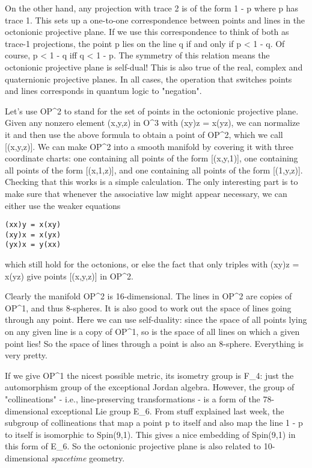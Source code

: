 On the other hand, any projection with trace 2 is of the form 1 - p
where p has trace 1.  This sets up a one-to-one correspondence between
points and lines in the octonionic projective plane.  If we use this
correspondence to think of both as trace-1 projections, the point p
lies on the line q if and only if p < 1 - q.  Of course, p < 1 - q
iff q < 1 - p.   The symmetry of this relation means the octonionic
projective plane is self-dual!  This is also true of the real, complex
and quaternionic projective planes.  In all cases, the operation that
switches points and lines corresponds in quantum logic to "negation".

Let's use OP^{2} to stand for the set of points in the
octonionic projective plane.  Given any nonzero element (x,y,z) in
O^{3} with (xy)z = x(yz), we can normalize it and then use the
above formula to obtain a point of OP^{2}, which we call
[(x,y,z)].  We can make OP^{2} into a smooth manifold by
covering it with three coordinate charts: one containing all points of
the form [(x,y,1)], one containing all points of the form [(x,1,z)], and
one containing all points of the form [(1,y,z)].  Checking that this
works is a simple calculation.  The only interesting part is to make
sure that whenever the associative law might appear necessary, we can
either use the weaker equations

\begin{verbatim}
(xx)y = x(xy) 
(xy)x = x(yx)
(yx)x = y(xx)
\end{verbatim}
    
which still hold for the octonions, or else the fact that only triples
with (xy)z = x(yz) give points [(x,y,z)] in OP^{2}.  

Clearly the manifold OP^{2} is 16-dimensional.  The lines in
OP^{2} are copies of OP^{1}, and thus 8-spheres.  It is
also good to work out the space of lines going through any point.  Here
we can use self-duality: since the space of all points lying on any
given line is a copy of OP^{1}, so is the space of all lines on
which a given point lies!  So the space of lines through a point is also
an 8-sphere.  Everything is very pretty.


If we give OP^{1} the nicest possible metric, its isometry group
is F_{4}: just the automorphism group of the exceptional Jordan
algebra.  However, the group of "collineations" - i.e.,
line-preserving transformations - is a form of the 78-dimensional
exceptional Lie group E_{6}.  From stuff explained last week,
the subgroup of collineations that map a point p to itself and also map
the line 1 - p to itself is isomorphic to Spin(9,1).  This gives a nice
embedding of Spin(9,1) in this form of E_{6}.  So the octonionic
projective plane is also related to 10-dimensional \emph{spacetime} 
geometry.

